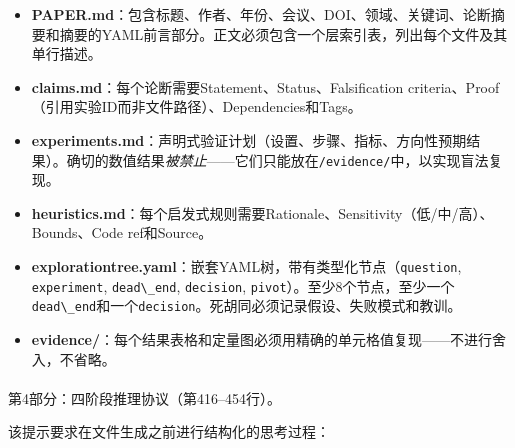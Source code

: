 \documentclass[
]{article}
\makeatletter
\let\oldparagraph\paragraph
\renewcommand{\paragraph}{
    \@ifstar
      \xxxParagraphStar
      \xxxParagraphNoStar
  }
\newcommand{\xxxParagraphStar}[1]{\oldparagraph*{#1}\mbox{}}
\newcommand{\xxxParagraphNoStar}[1]{\oldparagraph{#1}\mbox{}}
\newcommand{\passthrough}[1]{#1}
\providecommand{\tightlist}{%
  \setlength{\itemsep}{0pt}\setlength{\parskip}{0pt}}
\theoremstyle{definition}
\makeatother
\begin{document}
\begin{itemize}
\tightlist
\item
  \textbf{PAPER.md}：包含标题、作者、年份、会议、DOI、领域、关键词、论断摘要和摘要的YAML前言部分。正文必须包含一个层索引表，列出每个文件及其单行描述。
\item
  \textbf{claims.md}：每个论断需要Statement、Status、Falsification
  criteria、Proof（引用实验ID而非文件路径）、Dependencies和Tags。
\item
  \textbf{experiments.md}：声明式验证计划（设置、步骤、指标、方向性预期结果）。确切的数值结果\emph{被禁止}------它们只能放在\passthrough{\lstinline!/evidence/!}中，以实现盲法复现。
\item
  \textbf{heuristics.md}：每个启发式规则需要Rationale、Sensitivity（低/中/高）、Bounds、Code
  ref和Source。
\item
  \textbf{exploration\textunderscore{}tree.yaml}：嵌套YAML树，带有类型化节点（\passthrough{\lstinline!question!},
  \passthrough{\lstinline!experiment!},
  \passthrough{\lstinline!dead\_end!},
  \passthrough{\lstinline!decision!},
  \passthrough{\lstinline!pivot!}）。至少8个节点，至少一个\passthrough{\lstinline!dead\_end!}和一个\passthrough{\lstinline!decision!}。死胡同必须记录假设、失败模式和教训。
\item
  \textbf{evidence/}：每个结果表格和定量图必须用精确的单元格值复现------不进行舍入，不省略。
\end{itemize}

\paragraph{第4部分：四阶段推理协议（第416--454行）。}\label{ux7b2c4ux90e8ux5206ux56dbux9636ux6bb5ux63a8ux7406ux534fux8baeux7b2c416454ux884c}

该提示要求在文件生成之前进行结构化的思考过程：
\end{document}
